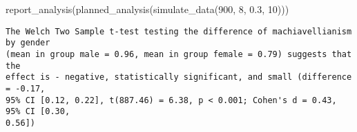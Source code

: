 \documentclass[psych,tutorial,accept,moreauthors,pdftex]{Definitions/mdpi}
\newenvironment{Shaded}{\begin{snugshade}}{\end{snugshade}}
\newcommand{\DecValTok}[1]{\textcolor[rgb]{0.00,0.00,0.81}{#1}}
\newcommand{\FloatTok}[1]{\textcolor[rgb]{0.00,0.00,0.81}{#1}}
\newcommand{\FunctionTok}[1]{\textcolor[rgb]{0.00,0.00,0.00}{#1}}
\newcommand{\NormalTok}[1]{#1}
\begin{document}
\nointerlineskip
\begin{adjustwidth}{0.5cm}{0cm} 
\begin{Shaded}
\begin{Highlighting}[]
\FunctionTok{report\_analysis}\NormalTok{(}\FunctionTok{planned\_analysis}\NormalTok{(}\FunctionTok{simulate\_data}\NormalTok{(}\DecValTok{900}\NormalTok{, }\DecValTok{8}\NormalTok{, }\FloatTok{0.3}\NormalTok{, }\DecValTok{10}\NormalTok{)))}
\end{Highlighting}
\end{Shaded}

\begin{verbatim}
The Welch Two Sample t-test testing the difference of machiavellianism by gender
(mean in group male = 0.96, mean in group female = 0.79) suggests that the
effect is - negative, statistically significant, and small (difference = -0.17,
95% CI [0.12, 0.22], t(887.46) = 6.38, p < 0.001; Cohen's d = 0.43, 95% CI [0.30,
0.56])
\end{verbatim}
\end{adjustwidth}
\end{document}
